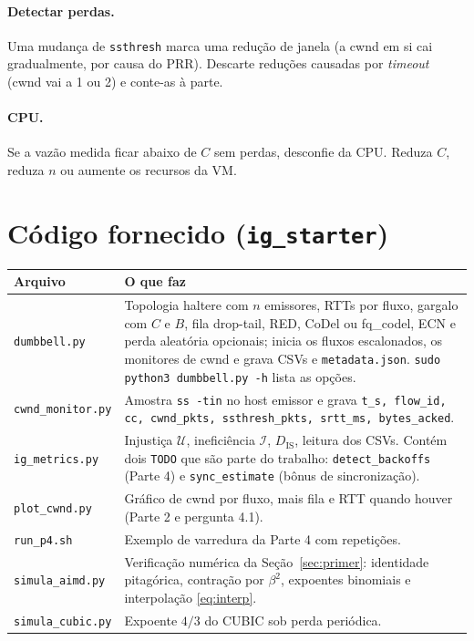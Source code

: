 \documentclass[11pt,a4paper]{article}
\newcommand{\Dis}{D_{\mathrm{IS}}}
\begin{document}
\paragraph{Detectar perdas.} Uma mudança de \texttt{ssthresh} marca uma redução de
janela (a cwnd em si cai gradualmente, por causa do PRR). Descarte reduções
causadas por \emph{timeout} (cwnd vai a 1 ou 2) e conte-as à parte.

\paragraph{CPU.} Se a vazão medida ficar abaixo de $C$ sem perdas, desconfie da CPU.
Reduza $C$, reduza $n$ ou aumente os recursos da VM.

\section{Código fornecido (\texttt{ig\_starter})}
\label{app:codigo}

\begin{center}
\begin{tabularx}{\textwidth}{@{}lX@{}}
\toprule
Arquivo & O que faz\\
\midrule
\texttt{dumbbell.py} & Topologia haltere com $n$ emissores, RTTs por fluxo, gargalo com
$C$ e $B$, fila drop-tail, RED, CoDel ou fq\_codel, ECN e perda aleatória opcionais; inicia os fluxos escalonados, os monitores de
cwnd e grava CSVs e \texttt{metadata.json}. \texttt{sudo python3 dumbbell.py -h} lista as
opções.\\
\texttt{cwnd\_monitor.py} & Amostra \texttt{ss -tin} no host emissor e grava
\texttt{t\_s, flow\_id, cc, cwnd\_pkts, ssthresh\_pkts, srtt\_ms, bytes\_acked}.\\
\texttt{ig\_metrics.py} & Injustiça $\mathcal U$, ineficiência $\mathcal I$, $\Dis$,
leitura dos CSVs. Contém dois \texttt{TODO} que são parte do trabalho:
\texttt{detect\_backoffs} (Parte 4) e \texttt{sync\_estimate} (bônus de sincronização).\\
\texttt{plot\_cwnd.py} & Gráfico de cwnd por fluxo, mais fila e RTT quando houver (Parte 2 e
pergunta 4.1).\\
\texttt{run\_p4.sh} & Exemplo de varredura da Parte 4 com repetições.\\
\texttt{simula\_aimd.py} & Verificação numérica da Seção~\ref{sec:primer}: identidade
pitagórica, contração por $\beta^2$, expoentes binomiais e interpolação \eqref{eq:interp}.\\
\texttt{simula\_cubic.py} & Expoente $4/3$ do CUBIC sob perda periódica.\\
\bottomrule
\end{tabularx}
\end{center}
\end{document}
